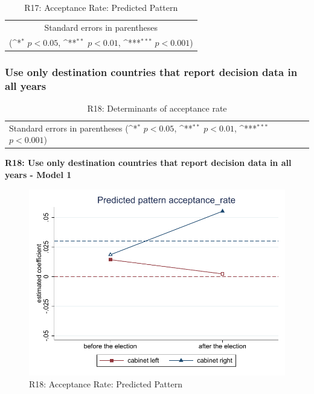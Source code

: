 \documentclass[10pt,a4paper]{scrartcl}
\begin{document}
\begin{table}[!ht]\centering
	\footnotesize
	\renewcommand{\arraystretch}{1.15}
	\def\sym#1{\ifmmode^{#1}\else\(^{#1}\)\fi}
	\caption{R17: Acceptance Rate: Predicted Pattern}
	\begin{tabular}{l*{2}{c}}
		\hline\hline
		
		\hline\hline
		\multicolumn{3}{c}{\footnotesize Standard errors in parentheses} \\
		\multicolumn{3}{c}{\footnotesize (\sym{*} \(p<0.05\), \sym{**} \(p<0.01\), \sym{***} \(p<0.001\))} \\
	\end{tabular}
\end{table}




\clearpage
\FloatBarrier
\subsubsection{Use only destination countries that report decision data in all years}
\begin{table}[!ht]\centering
	\renewcommand{\arraystretch}{1.25}
	\small
	\def\sym#1{\ifmmode^{#1}\else\(^{#1}\)\fi}
	\caption{R18: Determinants of acceptance rate}
	\begin{tabular}{l*{3}{c}}
		\hline\hline
		
		\hline\hline
		\multicolumn{4}{l}{\footnotesize Standard errors in parentheses (\sym{*} \(p<0.05\), \sym{**} \(p<0.01\), \sym{***} \(p<0.001\))}\\
	\end{tabular}
\end{table}

\clearpage
\textbf{R18: Use only destination countries that report decision data in all years - Model 1}
\begin{figure}[!ht]
	\centering
	\includegraphics[width=1\textwidth]{figures_edited/acceptance_rate_graph1_R18.pdf}
	\caption{R18: Acceptance Rate: Predicted Pattern}
\end{figure}
\end{document}
